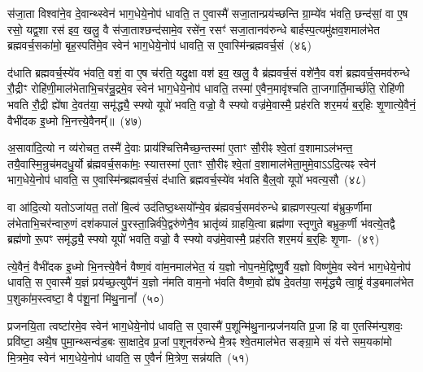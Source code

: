 स॑जा॒ता विश्वा॑ने॒व दे॒वान्थ्स्वेन॑ भाग॒धेये॒नोप॑ धावति॒ त ए॒वास्मै॑ सजा॒तान्प्रय॑च्छन्ति ग्रा॒म्ये॑व भ॑वति॒ छन्द॑सां॒ वा ए॒ष रसो॒ यद्व॒शा रस॑ इव॒ खलु॒ वै स॑जा॒ताश्छन्द॑सामे॒व रसे॑न॒ रसꣳ॑ सजा॒तानव॑\-रुन्धे बार्\mbox{}हस्प॒त्यमु॑क्षव॒शमाल॑भेत ब्रह्मवर्च॒सका॑मो॒ बृह॒स्पति॑मे॒व स्वेन॑ भाग॒धेये॒नोप॑ धावति॒ स ए॒वास्मि॑न्ब्रह्मवर्च॒सं~(४६)\ip

द॑धाति ब्रह्मवर्च॒स्ये॑व भ॑वति॒ वशं॒ वा ए॒ष च॑रति॒ यदु॒क्षा वश॑ इव॒ खलु॒ वै ब्र॑ह्मवर्च॒सं वशे॑नै॒व वशं॑ ब्रह्मवर्च॒समव॑\-रुन्धे रौ॒द्रीꣳ रोहि॑णी॒माल॑भेताभि॒चर॑न्रु॒द्रमे॒व स्वेन॑ भाग॒धेये॒नोप॑ धावति॒ तस्मा॑ ए॒वैन॒मावृ॑श्चति ता॒जगार्ति॒मार्च्छ॑ति॒ रोहि॑णी भवति रौ॒द्री ह्ये॑षा दे॒वत॑या॒ समृ॑द्ध्यै॒ स्फ्यो यूपो॑ भवति॒ वज्रो॒ वै स्फ्यो वज्र॑मे॒वास्मै॒ प्रह॑रति शर॒मयं॑ ब॒र्॒\mbox{}हिः शृ॒णात्ये॒वैनं॒ वैभी॑दक इ॒ध्मो भि॒नत्त्ये॒वैनम्᳚॥~(४७)\ip

{\anuvakamend[{अ॒भि खलु॒ वृष्टि॒श्छन्द॑सामे॒व रसे॑न प्र॒जामव॑ वैश्वदे॒वा वै ब्र॑ह्मवर्च॒सं यूप॒ एका॒न्नविꣳ॑श॒तिश्च॑।}]}

अ॒सावा॑दि॒त्यो न व्य॑रोचत॒ तस्मै॑ दे॒वाः प्राय॑श्चित्ति\-मैच्छ॒न्तस्मा॑ ए॒ताꣳ सौ॒रीꣴ श्वे॒तां व॒शामा\-ऽल॑भन्त॒ तयै॒वास्मि॒न्रुच॑मदधु॒र्यो ब्र॑ह्मवर्च॒सका॑मः॒ स्यात्तस्मा॑ ए॒ताꣳ सौ॒रीꣴ श्वे॒तां व॒शामाल॑भेता॒मुमे॒\-वा\-ऽऽ\-\-दि॒त्यꣴ स्वेन॑ भाग॒धेये॒नोप॑ धावति॒ स ए॒वास्मि॑न्ब्रह्मवर्च॒सं द॑धाति ब्रह्मवर्च॒स्ये॑व भ॑वति बै॒ल्॒\mbox{}वो यूपो॑ भवत्य॒सौ~(४८)\ip

वा आ॑दि॒त्यो यतो\-ऽजा॑यत॒ ततो॑ बि॒ल्व॑ उद॑तिष्ठ॒थ्सयो᳚न्ये॒व ब्र॑ह्मवर्च॒समव॑\-रुन्धे ब्राह्मणस्प॒त्यां ब॑भ्रुक॒र्णीमा ल॑भेताभि॒\-चर॑न्वारु॒णं दश॑\-कपालं पु॒रस्ता॒न्निर्व॑पे॒द्वरु॑णेनै॒व भ्रातृ॑व्यं ग्राहयि॒त्वा ब्रह्म॑णा स्तृणुते बभ्रुक॒र्णी भ॑वत्ये॒तद्वै ब्रह्म॑णो रू॒पꣳ समृ॑द्ध्यै॒ स्फ्यो यूपो॑ भवति॒ वज्रो॒ वै स्फ्यो वज्र॑मे॒वास्मै॒ प्रह॑रति शर॒मयं॑ ब॒र्॒\mbox{}हिः शृ॒णा-~(४९)\ip

त्ये॒वैनं॒ वैभी॑दक इ॒ध्मो भि॒नत्त्ये॒वैनं॑ वैष्ण॒वं वा॑म॒नमा\-ल॑भेत॒ यं य॒ज्ञो नोप॒नमे॒द्विष्णु॒र्वै य॒ज्ञो विष्णु॑मे॒व स्वेन॑ भाग॒धेये॒नोप॑ धावति॒ स ए॒वास्मै॑ य॒ज्ञं प्रय॑च्छ॒त्युपै॑नं य॒ज्ञो न॑मति वाम॒नो भ॑वति वैष्ण॒वो ह्ये॑ष दे॒वत॑या॒ समृ॑द्ध्यै त्वा॒ष्ट्रं व॑ड॒बमाल॑भेत प॒शुका॑म॒स्त्वष्टा॒ वै प॑शू॒नां मि॑थु॒नानां᳚~(५०)\ip

प्रजनयि॒ता त्वष्टा॑रमे॒व स्वेन॑ भाग॒धेये॒नोप॑ धावति॒ स ए॒वास्मै॑ प॒शून्मि॑थु॒नान्प्रज॑नयति प्र॒जा हि वा ए॒तस्मि॑न्प॒शवः॒ प्रवि॑ष्टा॒ अथै॒ष पुमा॒न्थ्सन्व॑ड॒बः सा॒क्षादे॒व प्र॒जां प॒शूनव॑\-रुन्धे मै॒त्रꣴ श्वे॒तमाल॑भेत सङ्ग्रा॒मे सं य॑त्ते सम॒यका॑मो मि॒त्रमे॒व स्वेन॑ भाग॒धेये॒नोप॑ धावति॒ स ए॒वैनं॑ मि॒त्रेण॒ सन्न॑यति~(५१)\ip

